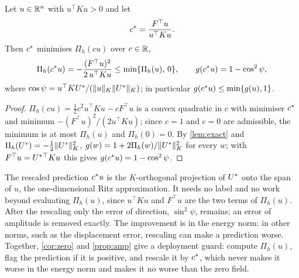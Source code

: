 \begin{proposition}\label{prop:amp}
Let $u\in\mathbb{R}^{n}$ with $u^{\top}Ku>0$ and let
\begin{equation}
c^{\ast} = \frac{F^{\top}u}{u^{\top}Ku}.
\label{eq:cstar}
\end{equation}
Then $c^{\ast}$ minimises $\Pi_h(cu)$ over $c\in\mathbb{R}$,
\begin{equation}
\Pi_h(c^{\ast} u) = -\frac{(F^{\top}u)^{2}}{2\,u^{\top}Ku} \le \min\{\Pi_h(u),\,0\},
\qquad
g(c^{\ast} u) = 1-\cos^{2}\psi ,
\label{eq:amp}
\end{equation}
where $\cos\psi=u^{\top}KU^{\ast}/(\lVert u\rVert_K\lVert U^{\ast}\rVert_K)$; in particular
$g(c^{\ast} u)\le\min\{g(u),1\}$.
\end{proposition}

\begin{proof}
$\Pi_h(cu)=\tfrac12c^2u^{\top}Ku-cF^{\top}u$ is a convex quadratic in $c$ with minimiser
$c^{\ast}$ and minimum $-(F^{\top}u)^2/(2u^{\top}Ku)$; since $c=1$ and $c=0$ are admissible,
the minimum is at most $\Pi_h(u)$ and $\Pi_h(0)=0$. By \cref{lem:exact} and
$\Pi_h(U^{\ast})=-\tfrac12\lVert U^{\ast}\rVert_K^2$, $g(w)=1+2\Pi_h(w)/\lVert U^{\ast}\rVert_K^2$ for every
$w$; with $F^{\top}u=U^{\ast}{}^{\top}Ku$ this gives $g(c^{\ast} u)=1-\cos^2\psi$.
\end{proof}

The rescaled prediction $c^{\ast} u$ is the $K$-orthogonal projection of $U^{\ast}$ onto the
span of $u$, the one-dimensional Ritz approximation. It needs no label and no work beyond
evaluating $\Pi_h(u)$, since $u^{\top}Ku$ and $F^{\top}u$ are the two terms of $\Pi_h(u)$.
After the rescaling only the error of direction, $\sin^2\psi$, remains; an error of
amplitude is removed exactly. The improvement is in the energy norm: in other norms,
such as the displacement error, rescaling can make a prediction worse. Together,
\cref{cor:zero} and \cref{prop:amp} give a deployment guard: compute $\Pi_h(u)$, flag the
prediction if it is positive, and rescale it by $c^{\ast}$, which never makes it worse in the
energy norm and makes it no worse than the zero field.
